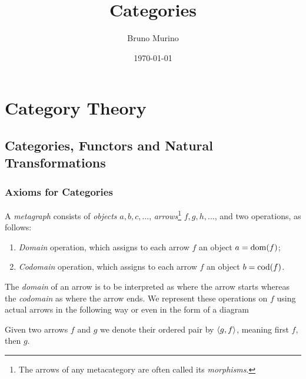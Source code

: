 \documentclass[oneside, 10pt, notitlepage]{book}
\title{Categories} %
\author{Bruno Murino} %
\date{\today} %
\begin{document}

\dominitoc
\faketableofcontents

\part{Category Theory}
\chapter{Categories, Functors and Natural Transformations}
\minitoc

\section{Axioms for Categories}


\begin{definition}[Metagraph]
	A \emph{metagraph} consists of \emph{objects} \(a,b,c,...\), \emph{arrows}\footnote{The arrows of any metacategory are often called its \emph{morphisms}.} \(f,g,h,...\), and two operations, as follows:
	\begin{enumerate}
		\item \emph{Domain} operation, which assigns to each arrow \(f\) an object \(a=\operatorname{dom}(f)\);
		\item \emph{Codomain} operation, which assigns to each arrow \(f\) an object \(b=\operatorname{cod}(f)\).
	\end{enumerate}
	The \emph{domain} of an arrow is to be interpreted as where the arrow starts whereas the \emph{codomain} as where the arrow ends. We represent these operations on \(f\) using actual arrows in the following way
	or even in the form of a diagram
	\begin{center}\end{center}
\end{definition}

\begin{definition}
	Given two arrows \(f\) and \(g\) we denote their ordered pair by \(\left\langle g,f \right\rangle\), meaning first \(f\), then \(g\).
\end{definition}
\end{document}

